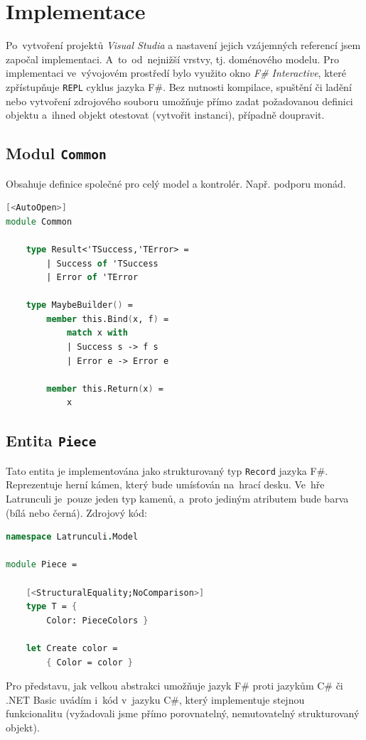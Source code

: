 \documentclass[12pt]{article}
\begin{document}
\section{Implementace}
Po~vytvoření projektů \emph{Visual Studia} a nastavení jejich vzájemných referencí jsem započal implementaci. A~to~od~nejnižší vrstvy, tj. doménového modelu. Pro implementaci ve~vývojovém prostředí bylo využito okno \emph{F\# Interactive}, které zpřístupňuje \texttt{REPL} cyklus jazyka F\#. Bez nutnosti kompilace, spuštění či ladění nebo vytvoření zdrojového souboru umožňuje přímo zadat požadovanou definici objektu a~ihned objekt otestovat (vytvořit instanci), případně doupravit.

\subsection{Modul \texttt{Common}}
Obsahuje definice společné pro celý model a kontrolér. Např. podporu monád.
\begin{lstlisting}[language=FSharp]
[<AutoOpen>]
module Common

    type Result<'TSuccess,'TError> = 
        | Success of 'TSuccess 
        | Error of 'TError

    type MaybeBuilder() =
        member this.Bind(x, f) = 
            match x with
            | Success s -> f s
            | Error e -> Error e

        member this.Return(x) = 
            x
\end{lstlisting}

\subsection{Entita \texttt{Piece}}
Tato entita je implementována jako strukturovaný typ \texttt{Record} jazyka F\#. Reprezentuje herní kámen, který bude umísťován na~hrací desku. Ve~hře Latrunculi je~pouze jeden typ kamenů, a~proto jediným atributem bude barva (bílá nebo černá).
Zdrojový kód:
\begin{lstlisting}[language=FSharp]
namespace Latrunculi.Model

module Piece =

    [<StructuralEquality;NoComparison>]
    type T = {
        Color: PieceColors }
    
    let Create color =
        { Color = color }
\end{lstlisting}
Pro představu, jak velkou abstrakci umožňuje jazyk F\# proti jazykům C\# či .NET Basic uvádím i~kód v~jazyku C\#, který implementuje stejnou funkcionalitu (vyžadovali jsme přímo porovnatelný, nemutovatelný strukturovaný objekt).
\end{document}
